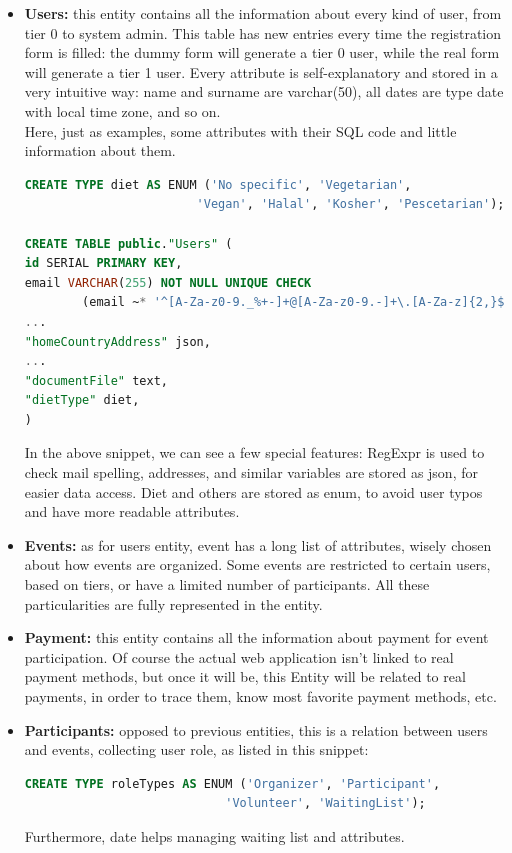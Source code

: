 \begin{itemize}
    \item \textbf{Users:} this entity contains all the information about every kind of user, from
    tier 0 to system admin. This table has new entries every time the registration form is filled: the dummy
    form will generate a tier 0 user, while the real form will generate a tier 1 user. Every attribute 
    is self-explanatory and stored in a very intuitive way: name and surname are varchar(50), all dates
    are type date with local time zone, and so on.\\
    Here, just as examples, some attributes with their SQL code and little information about them.
\begin{lstlisting}[language=SQL]
CREATE TYPE diet AS ENUM ('No specific', 'Vegetarian',
                        'Vegan', 'Halal', 'Kosher', 'Pescetarian');

CREATE TABLE public."Users" (
id SERIAL PRIMARY KEY,
email VARCHAR(255) NOT NULL UNIQUE CHECK 
        (email ~* '^[A-Za-z0-9._%+-]+@[A-Za-z0-9.-]+\.[A-Za-z]{2,}$'),
...
"homeCountryAddress" json,
...
"documentFile" text,
"dietType" diet,
)
\end{lstlisting}
    In the above snippet, we can see a few special features: RegExpr is used to check mail spelling,
    addresses, and similar variables are stored as json, for easier data access. Diet and others
    are stored as enum, to avoid user typos and have more readable attributes.
    \item \textbf{Events:} as for users entity, event has a long list of attributes, wisely chosen
    about how events are organized. Some events are restricted to certain users, based
    on tiers, or have a limited number of participants. All these particularities are fully represented
    in the entity.
    \item \textbf{Payment:} this entity contains all the information about payment for event participation.
    Of course the actual web application isn't linked to real payment methods, but once it will be, this Entity
    will be related to real payments, in order to trace them, know most favorite payment methods, etc.
    \item \textbf{Participants:} opposed to previous entities, this is a relation between users and events,
    collecting user role, as listed in this snippet:
\begin{lstlisting}[language=SQL]
CREATE TYPE roleTypes AS ENUM ('Organizer', 'Participant',
                            'Volunteer', 'WaitingList');
\end{lstlisting}
    Furthermore, date helps managing waiting list and attributes.
\end{itemize}